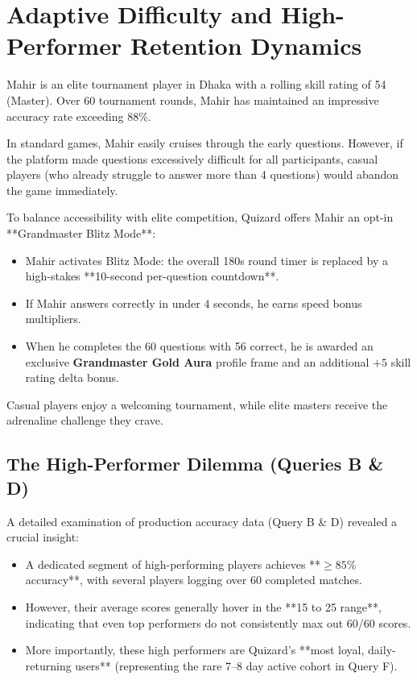 \chapter{Adaptive Difficulty and High-Performer Retention Dynamics}

\begin{tcolorbox}[storybox, title={The Story of Mahir's Grandmaster Blitz Challenge}]
Mahir is an elite tournament player in Dhaka with a rolling skill rating of 54 (Master). Over 60 tournament rounds, Mahir has maintained an impressive accuracy rate exceeding 88\%.

In standard games, Mahir easily cruises through the early questions. However, if the platform made questions excessively difficult for all participants, casual players (who already struggle to answer more than 4 questions) would abandon the game immediately.

To balance accessibility with elite competition, Quizard offers Mahir an opt-in **Grandmaster Blitz Mode**:
\begin{itemize}
    \item Mahir activates Blitz Mode: the overall 180s round timer is replaced by a high-stakes **10-second per-question countdown**.
    \item If Mahir answers correctly in under 4 seconds, he earns speed bonus multipliers.
    \item When he completes the 60 questions with 56 correct, he is awarded an exclusive \textbf{Grandmaster Gold Aura} profile frame and an additional $+5$ skill rating delta bonus.
\end{itemize}
Casual players enjoy a welcoming tournament, while elite masters receive the adrenaline challenge they crave.
\end{tcolorbox}

\section{The High-Performer Dilemma (Queries B \& D)}
A detailed examination of production accuracy data (Query B \& D) revealed a crucial insight:
\begin{itemize}
    \item A dedicated segment of high-performing players achieves **$\ge 85\%$ accuracy**, with several players logging over 60 completed matches.
    \item However, their average scores generally hover in the **15 to 25 range**, indicating that even top performers do not consistently max out 60/60 scores.
    \item More importantly, these high performers are Quizard's **most loyal, daily-returning users** (representing the rare 7--8 day active cohort in Query F).
\end{itemize}

